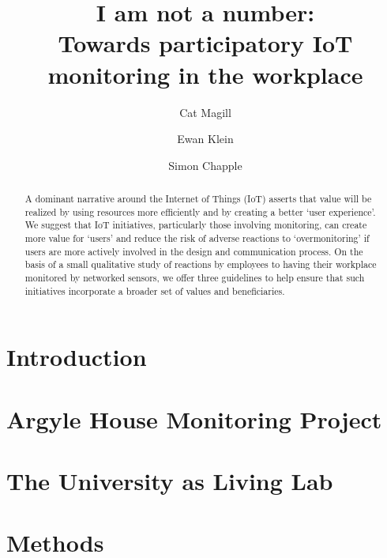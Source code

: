 \documentclass[10pt,twocolumn]{article}
\begin{document}
\title{\bfseries I am not a number:\\
Towards participatory IoT monitoring in the workplace}

\author[*]{Cat Magill}
\author[*]{Ewan Klein}
\author[$\dagger$]{Simon Chapple}
\date{}

\maketitle

\begin{abstract}
A dominant narrative around the Internet of Things (IoT) asserts that
value will be realized by using resources more efficiently and by
creating a better ‘user experience’.  We suggest that IoT initiatives,
particularly those involving monitoring, can create more value for
`users' and reduce the risk of adverse reactions to `overmonitoring'
if users are more actively involved in the design and communication
process.  On the basis of a small qualitative study of reactions by
employees to having their workplace monitored by networked sensors, we
offer three guidelines to help ensure that such initiatives
incorporate a broader set of values and beneficiaries. 
\end{abstract}



\section{Introduction}
\label{sec:introduction}



\section{Argyle House Monitoring Project}
\label{sec:argyle-house}



\section{The University as Living Lab}
\label{sec:university-as-ll}



\section{Methods}
\label{sec:methods}
\end{document}
